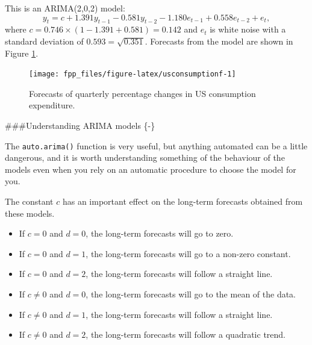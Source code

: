 \documentclass[]{book}
\newenvironment{Shaded}{\begin{snugshade}}{\end{snugshade}}
\newcommand{\DataTypeTok}[1]{\textcolor[rgb]{0.13,0.29,0.53}{#1}}
\newcommand{\DecValTok}[1]{\textcolor[rgb]{0.00,0.00,0.81}{#1}}
\newcommand{\KeywordTok}[1]{\textcolor[rgb]{0.13,0.29,0.53}{\textbf{#1}}}
\newcommand{\NormalTok}[1]{#1}
\newcommand{\OperatorTok}[1]{\textcolor[rgb]{0.81,0.36,0.00}{\textbf{#1}}}
\newcommand{\StringTok}[1]{\textcolor[rgb]{0.31,0.60,0.02}{#1}}
\providecommand{\tightlist}{%
  \setlength{\itemsep}{0pt}\setlength{\parskip}{0pt}}
\begin{document}
This is an ARIMA(2,0,2) model:
\[
  y_t = c + 1.391y_{t-1}
          -0.581 y_{t-2}
          -1.180 e_{t-1}
          + 0.558 e_{t-2}
          + e_{t},
\]
where \(c= 0.746 \times (1 - 1.391 + 0.581) = 0.142\)
and \(e_t\) is white noise with a standard deviation of \(0.593 = \sqrt{0.351}\). Forecasts from the model are shown in Figure \ref{fig:usconsumptionf}.

\begin{Shaded}
\end{Shaded}

\begin{figure}

{\centering \texttt{[image: fpp\_files/figure-latex/usconsumptionf-1]} 

}

\caption{Forecasts of quarterly percentage changes in US consumption expenditure.}\label{fig:usconsumptionf}
\end{figure}

\#\#\#Understanding ARIMA models \{-\}

The \texttt{auto.arima()} function is very useful, but anything automated can be a little dangerous, and it is worth understanding something of the behaviour of the models even when you rely on an automatic procedure to choose the model for you.

The constant \(c\) has an important effect on the long-term forecasts obtained from these models.

\begin{itemize}
\tightlist
\item
  If \(c=0\) and \(d=0\), the long-term forecasts will go to zero.
\item
  If \(c=0\) and \(d=1\), the long-term forecasts will go to a non-zero constant.
\item
  If \(c=0\) and \(d=2\), the long-term forecasts will follow a straight line.
\item
  If \(c\ne0\) and \(d=0\), the long-term forecasts will go to the mean of the data.
\item
  If \(c\ne0\) and \(d=1\), the long-term forecasts will follow a straight line.
\item
  If \(c\ne0\) and \(d=2\), the long-term forecasts will follow a quadratic trend.
\end{itemize}
\end{document}
